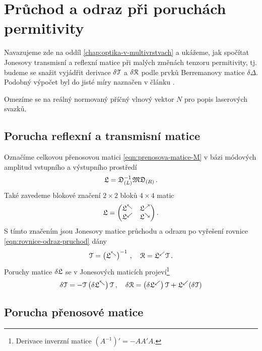 \section{Průchod a odraz při poruchách permitivity}
\label{app:berreman}

Navazujeme zde na oddíl \ref{chap:optika-v-multivrstvach} a ukážeme, jak spočítat Jonesovy transmisní a reflexní matice při malých změnách tenzoru permitivity, tj. budeme se snažit vyjádřit derivace $\delta\mathcal{T}$ a $\delta\mathcal{R}$ podle prvků Berremanovy matice $\delta\Delta$.
Podobný výpočet byl do jisté míry naznačen v článku \cite{bertrandGeneralAnalyticalTreatment2001}.

Omezíme se na reálný normovaný příčný vlnový vektor $N$ pro popis laserových svazků.

\subsection*{Porucha reflexní a transmisní matice}

Označíme celkovou přenosovou matici \eqref{eqn:prenosova-matice-M} v bázi módových amplitud vstupního a výstupního prostředí
\begin{equation}
    \mathfrak{L} = \mathfrak{D}_{(L)}^{-1} \mathfrak{M}  \mathfrak{D}_{(R)} \,.
\end{equation}
Také zavedeme blokové značení $2\times2$ bloků $4\times4$ matic
\begin{equation}
    \mathfrak{L} = \begin{pmatrix} \mathfrak{L}^\nwarrow & \mathfrak{L}^\nearrow \\
    \mathfrak{L}^\swarrow & \mathfrak{L}^\searrow \end{pmatrix} .
\end{equation}
S tímto značením jsou Jonesovy matice průchodu a odrazu po vyřešení rovnice \eqref{eqn:rovnice-odraz-pruchod} dány
\begin{equation}
    \mathcal{T} = \left(\mathfrak{L}^\nwarrow\right)^{-1} \,, \quad \mathcal{R}=\mathfrak{L}^\swarrow \mathcal{T} \,.
\end{equation}
Poruchy matice $\delta\mathfrak{L}$ se v Jonesových maticích projeví\footnote{Derivace inverzní matice $(A^{-1})'=-AA'A$.}
\begin{equation}
    \label{eqn:app-derivace-RT}
    \delta\mathcal{T} = -\mathcal{T} \left(\delta\mathfrak{L}^\nwarrow \right) \mathcal{T} \,, \quad \delta\mathcal{R}=\left(\delta\mathfrak{L}^\swarrow\right) \mathcal{T} + \mathfrak{L}^\swarrow (\delta\mathcal{T})
\end{equation}

\subsection*{Porucha přenosové matice}
